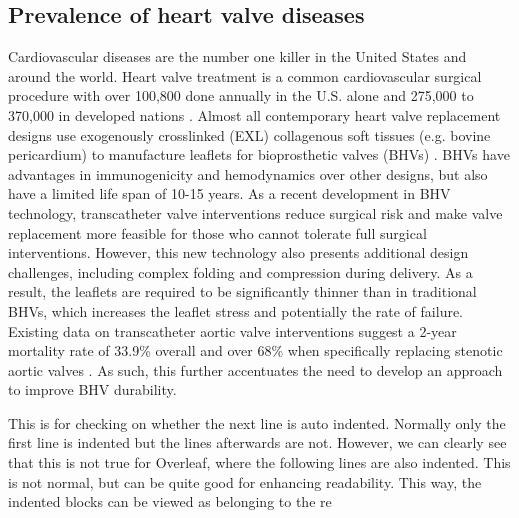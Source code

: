 \subsection{Prevalence of heart valve diseases}
    Cardiovascular diseases are the number one killer in the United States and around the world. 
Heart valve treatment is a common cardiovascular surgical procedure with over 100,800 done annually in the U.S. alone \cite{mozaffarian_heart_2016} and 275,000 to 370,000 in developed nations \cite{manji_future_2012}. Almost all contemporary heart valve replacement designs use exogenously crosslinked (EXL) collagenous soft tissues (e.g. bovine pericardium) to manufacture leaflets for bioprosthetic valves (BHVs) \cite{starr_artificial_2007, soares_biomechanical_2016}. BHVs have advantages in immunogenicity and hemodynamics over other designs, but also have a limited life span of 10-15 years. As a recent development in BHV technology, transcatheter valve interventions \cite{bonow_accaha_2006, guidoin_marvel_2010} reduce surgical risk and make valve replacement more feasible for those who cannot tolerate full surgical interventions. However, this new technology also presents additional design challenges, including complex folding and compression during delivery. As a result, the leaflets are required to be significantly thinner than in traditional BHVs, which increases the leaflet stress and potentially the rate of failure. Existing data on transcatheter aortic valve interventions suggest a 2-year mortality rate of 33.9\% overall \cite{mozaffarian_heart_2016} and over 68\% when specifically replacing stenotic aortic valves \cite{makkar_transcatheter_2012}. As such, this further accentuates the need to develop an approach to improve BHV durability. 

    This is for checking on whether the next line is auto indented. Normally only the first line is indented but the lines afterwards are not. However, we can clearly see that this is not true for Overleaf, where the following lines are also indented. This is not normal, but can be quite good for enhancing readability. This way, the indented blocks can be viewed as belonging to the re
    
